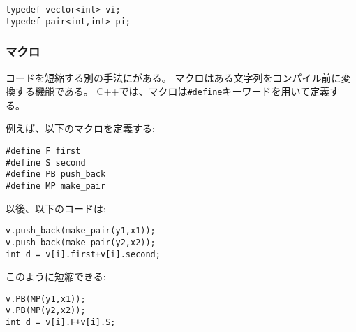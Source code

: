 \begin{lstlisting}
typedef vector<int> vi;
typedef pair<int,int> pi;
\end{lstlisting}

\begin{comment}
\subsubsection{Macros}
\index{macro}
Another way to shorten code is to define
\key{macros}.
A macro means that certain strings in
the code will be changed before the compilation.
In C++, macros are defined using the
\texttt{\#define} keyword.
\end{comment}

\subsubsection{マクロ}
コードを短縮する別の手法にがある。
マクロはある文字列をコンパイル前に変換する機能である。
C++では、マクロは\texttt{\#define}キーワードを用いて定義する。

\begin{comment}
For example, we can define the following macros:
\begin{lstlisting}
#define F first
#define S second
#define PB push_back
#define MP make_pair
\end{lstlisting}
After this, the code
\begin{lstlisting}
v.push_back(make_pair(y1,x1));
v.push_back(make_pair(y2,x2));
int d = v[i].first+v[i].second;
\end{lstlisting}
can be shortened as follows:
\begin{lstlisting}
v.PB(MP(y1,x1));
v.PB(MP(y2,x2));
int d = v[i].F+v[i].S;
\end{lstlisting}
\end{comment}

例えば、以下のマクロを定義する:
\begin{lstlisting}
#define F first
#define S second
#define PB push_back
#define MP make_pair
\end{lstlisting}

以後、以下のコードは:
\begin{lstlisting}
v.push_back(make_pair(y1,x1));
v.push_back(make_pair(y2,x2));
int d = v[i].first+v[i].second;
\end{lstlisting}

このように短縮できる:
\begin{lstlisting}
v.PB(MP(y1,x1));
v.PB(MP(y2,x2));
int d = v[i].F+v[i].S;
\end{lstlisting}


